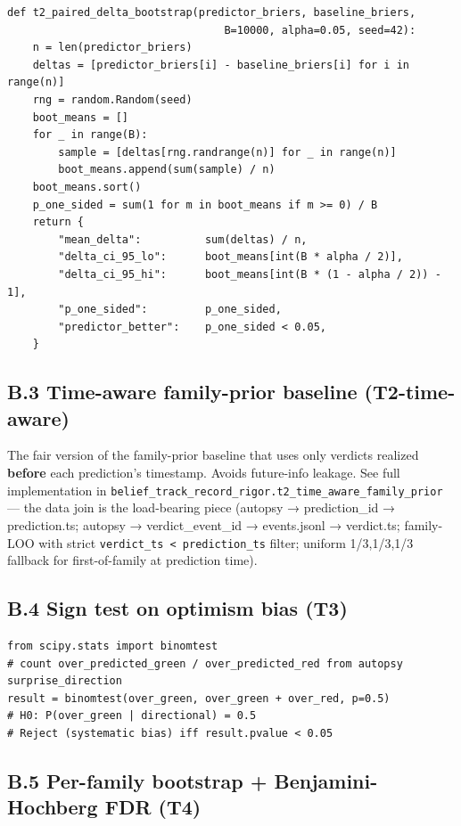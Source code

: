 \documentclass[11pt,a4paper]{article}
\begin{document}
\begin{lstlisting}
def t2_paired_delta_bootstrap(predictor_briers, baseline_briers,
                                  B=10000, alpha=0.05, seed=42):
    n = len(predictor_briers)
    deltas = [predictor_briers[i] - baseline_briers[i] for i in range(n)]
    rng = random.Random(seed)
    boot_means = []
    for _ in range(B):
        sample = [deltas[rng.randrange(n)] for _ in range(n)]
        boot_means.append(sum(sample) / n)
    boot_means.sort()
    p_one_sided = sum(1 for m in boot_means if m >= 0) / B
    return {
        "mean_delta":          sum(deltas) / n,
        "delta_ci_95_lo":      boot_means[int(B * alpha / 2)],
        "delta_ci_95_hi":      boot_means[int(B * (1 - alpha / 2)) - 1],
        "p_one_sided":         p_one_sided,
        "predictor_better":    p_one_sided < 0.05,
    }
\end{lstlisting}

\subsection{B.3 Time-aware family-prior baseline (T2-time-aware)}

The fair version of the family-prior baseline that uses only verdicts realized \textbf{before} each prediction's timestamp. Avoids future-info leakage. See full implementation in \texttt{belief\_track\_record\_rigor.t2\_time\_aware\_family\_prior} — the data join is the load-bearing piece (autopsy → prediction\_id → prediction.ts; autopsy → verdict\_event\_id → events.jsonl → verdict.ts; family-LOO with strict \texttt{verdict\_ts < prediction\_ts} filter; uniform 1/3,1/3,1/3 fallback for first-of-family at prediction time).

\subsection{B.4 Sign test on optimism bias (T3)}

\begin{lstlisting}
from scipy.stats import binomtest
# count over_predicted_green / over_predicted_red from autopsy surprise_direction
result = binomtest(over_green, over_green + over_red, p=0.5)
# H0: P(over_green | directional) = 0.5
# Reject (systematic bias) iff result.pvalue < 0.05
\end{lstlisting}

\subsection{B.5 Per-family bootstrap + Benjamini-Hochberg FDR (T4)}
\end{document}
